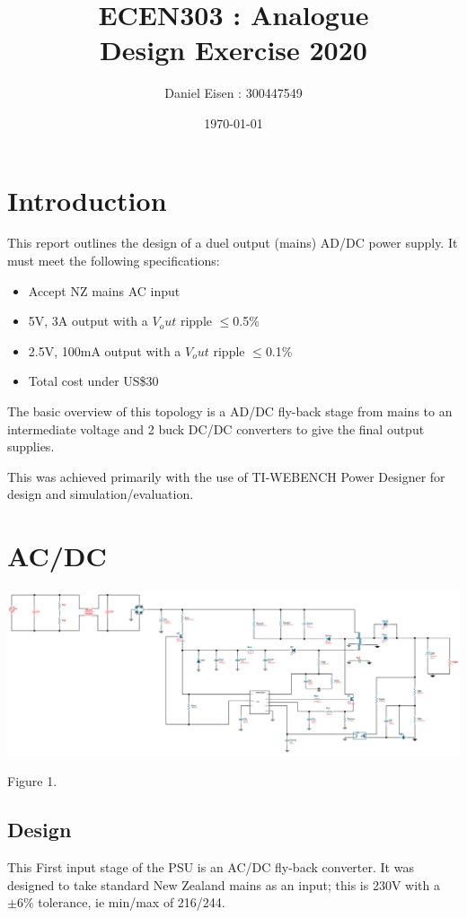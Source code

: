 \documentclass[11pt, a4]{article}
\title{ECEN303 : Analogue \\ Design Exercise 2020}
\author{Daniel Eisen : 300447549}
\date{\today}
\begin{document}
\maketitle
\tableofcontents
\section{Introduction}
This report outlines the design of a duel output (mains) AD/DC power supply.
It must meet the following specifications:
\begin{itemize}
        \item Accept NZ mains AC input
        \item 5V, 3A output with a $V_out$ ripple $\le$0.5\%
        \item 2.5V, 100mA output with a $V_out$ ripple $\le$0.1\%
        \item Total cost under US\$30
\end{itemize}

The basic overview of this topology is a AD/DC fly-back stage from mains to an intermediate voltage and 2 buck DC/DC converters to give the final output supplies.

This was achieved primarily with the use of TI-WEBENCH Power Designer\cite{tibad} for design and simulation/evaluation. 

\section{AC/DC}
\includegraphics[width=\textwidth]{img/acdc.png}
\begin{center}
        Figure 1.
\end{center}
\subsection{Design}
This First input stage of the PSU is an AC/DC fly-back converter. It was designed to take standard New Zealand mains as an input; this is 230V with a $\pm6\%$ tolerance\cite{mains}, ie min/max of 216/244.
\end{document}
